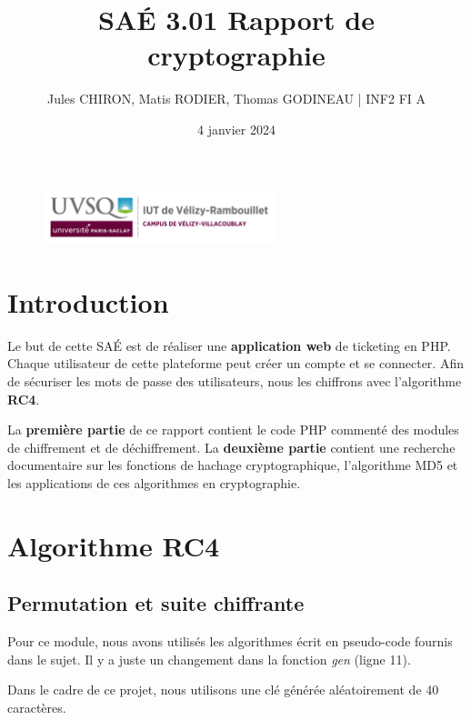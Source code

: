 \documentclass[12pt, a4paper]{article}
\title{SAÉ 3.01 Rapport de cryptographie}
\author{Jules CHIRON, Matis RODIER, Thomas GODINEAU | INF2 FI A}
\date{4 janvier 2024}
\begin{document}
\maketitle

\begin{figure}[h]
    \includegraphics[width=0.6\textwidth]{../annexes/logo_uvsq}
\end{figure}

\tableofcontents{}
\section*{Introduction}

Le but de cette SAÉ est de réaliser une \textbf{application web} de ticketing en PHP.\@
Chaque utilisateur de cette plateforme peut créer un compte et se connecter.
Afin de sécuriser les mots de passe des utilisateurs, nous les chiffrons avec l'algorithme \textbf{RC4}.
\bigskip

La \textbf{première partie} de ce rapport contient le code PHP commenté des modules de chiffrement et de déchiffrement.
La \textbf{deuxième partie} contient une recherche documentaire sur les fonctions de hachage cryptographique,
l'algorithme MD5 et les applications de ces algorithmes en cryptographie.

\section{Algorithme RC4}

\subsection*{Permutation et suite chiffrante}

Pour ce module,
nous avons utilisés les algorithmes écrit en pseudo-code fournis dans le sujet.
Il y a juste un changement dans la fonction \textit{gen} (ligne 11).

\noindent Dans le cadre de ce projet, nous utilisons une clé générée aléatoirement de 40 caractères.

\end{document}
